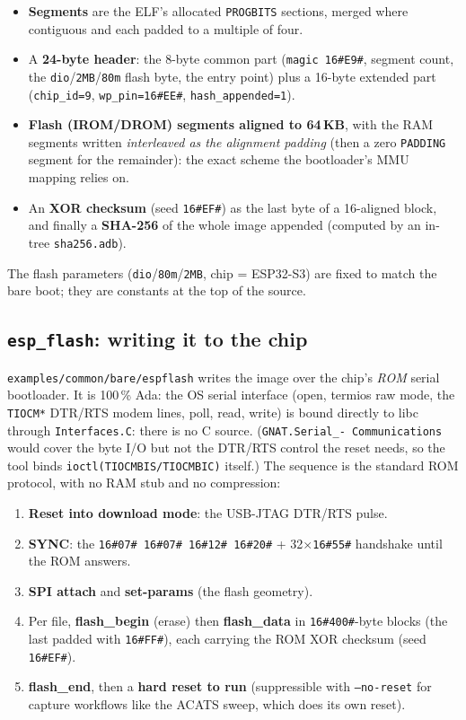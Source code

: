 \begin{itemize}
  \item \textbf{Segments} are the ELF's allocated \texttt{PROGBITS} sections,
        merged where contiguous and each padded to a multiple of four.
  \item A \textbf{24-byte header}: the 8-byte common part (\texttt{magic 16\#E9\#},
        segment count, the \texttt{dio}/\texttt{2MB}/\texttt{80m} flash byte, the
        entry point) plus a 16-byte extended part (\texttt{chip\_id=9},
        \texttt{wp\_pin=16\#EE\#}, \texttt{hash\_appended=1}).
  \item \textbf{Flash (IROM/DROM) segments aligned to 64\,KB}, with the RAM
        segments written \emph{interleaved as the alignment padding} (then a zero
        \texttt{PADDING} segment for the remainder): the exact scheme the
        bootloader's MMU mapping relies on.
  \item An \textbf{XOR checksum} (seed \texttt{16\#EF\#}) as the last byte of a
        16-aligned block, and finally a \textbf{SHA-256} of the whole image
        appended (computed by an in-tree \texttt{sha256.adb}).
\end{itemize}

The flash parameters (\texttt{dio}/\texttt{80m}/\texttt{2MB}, chip = ESP32-S3) are
fixed to match the bare boot; they are constants at the top of the source.

\subsection{\texttt{esp\_flash}: writing it to the chip}

\texttt{examples/common/bare/espflash} writes the image over the chip's
\emph{ROM} serial bootloader.
It is 100\,\% Ada: the OS serial interface (open, termios raw mode, the
\texttt{TIOCM*} DTR/RTS modem lines, poll, read, write) is bound directly to libc
through \texttt{Interfaces.C}: there is no C source. (\texttt{GNAT.Serial\_-
Communications} would cover the byte I/O but not the DTR/RTS control the reset
needs, so the tool binds \texttt{ioctl(TIOCMBIS/TIOCMBIC)} itself.) The sequence
is the standard ROM protocol, with no RAM stub and no compression:

\begin{enumerate}
  \item \textbf{Reset into download mode}: the USB-JTAG DTR/RTS pulse.
  \item \textbf{SYNC}: the \texttt{16\#07\# 16\#07\# 16\#12\# 16\#20\#} + 32$\times$\texttt{16\#55\#}
        handshake until the ROM answers.
  \item \textbf{SPI attach} and \textbf{set-params} (the flash geometry).
  \item Per file, \textbf{flash\_begin} (erase) then \textbf{flash\_data} in
        \texttt{16\#400\#}-byte blocks (the last padded with \texttt{16\#FF\#}), each
        carrying the ROM XOR checksum (seed \texttt{16\#EF\#}).
  \item \textbf{flash\_end}, then a \textbf{hard reset to run} (suppressible with
        \texttt{--no-reset} for capture workflows like the ACATS sweep, which
        does its own reset).
\end{enumerate}

